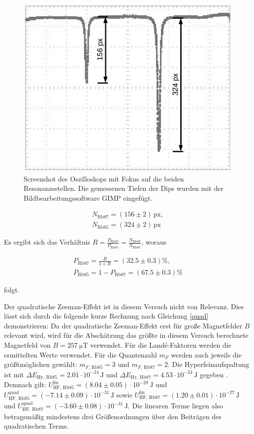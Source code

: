 \begin{figure}
	\centering
	\includegraphics[width=0.7\linewidth]{img/oszi2_3}
	\caption{Screenshot des Oszilloskops mit Fokus auf die beiden Resonanzsstellen. Die gemessenen Tiefen der Dips wurden mit der Bildbearbeitungssoftware GIMP eingefügt.}
	\label{fig:oszi2_3}
\end{figure}

\begin{eqnarray}
	N_{\text{Rb}87} = (156 \pm 2)\, \text{px},\\
	N_{\text{Rb}85} = (324 \pm 2)\, \text{px}
\end{eqnarray}

Es ergibt sich das Verhältnis $R = \frac{P_{\text{Rb}87}}{P_{\text{Rb}85}} = \frac{N_{\text{Rb}87}}{N_{\text{Rb}85}}$, woraus

\begin{eqnarray}
	P_{\text{Rb}87} = \frac{R}{1 + R} = (32.5 \pm 0.3) \%, \\
	P_{\text{Rb}85} = 1 - P_{\text{Rb}87} = (67.5 \pm 0.3) \%
\end{eqnarray}

folgt.

Der quadratische Zeeman-Effekt ist in diesem Versuch nicht von Relevanz. Dies lässt sich 
durch die folgende kurze Rechnung nach Gleichung \eqref{quad} demonstrieren: Da der quadratische 
Zeeman-Effekt erst für große Magnetfelder $B$ relevant wird, wird für die Abschätzung das 
größte in diesem Versuch berechnete Magnetfeld von $B = \SI{257}{\micro \tesla}$ verwendet. Für die 
Landé-Faktoren werden die ermittelten Werte verwendet. Für die Quantenzahl $m_F$ werden auch
 jeweils die größtmöglichen gewählt: $m_{F, \, \text{Rb}85} = 3$ und $m_{F, \, \text{Rb}87} = 2$.
  Die Hyperfeinaufspaltung ist mit $\Delta E_{\text{Hy}, \, \text{Rb}85} = {2.01 \cdot 10^{-24}}\, \text{J}$ und
   $\Delta E_{\text{Hy}, \, \text{Rb}87} = {4.53 \cdot 10^{-24}}\, \text{J}$ gegeben \cite{V21}.
   Demnach gilt: 
    $U_{\text{HF}, \, \text{Rb}85}^\text{lin} = {(8.04 \pm 0.05) \cdot 10^{-28}}\, \text{J}$ und 
    $U_{\text{HF}, \, \text{Rb}85}^\text{quad} = {(-7.14 \pm 0.09) \cdot 10^{-31}}\, \text{J}$ sowie
     $U_{\text{HF}, \, \text{Rb}87}^\text{lin} = {(1.20 \pm 0.01) \cdot 10^{-27}}\, \text{J}$ und
     $U_{\text{HF}, \, \text{Rb}87}^\text{quad} = {(-3.60 \pm 0.08) \cdot 10^{-31}}\, \text{J}$. 
     Die linearen Terme liegen also betragsmäßig mindestens drei Größenordnungen über den Beiträgen des quadratischen Terms. 